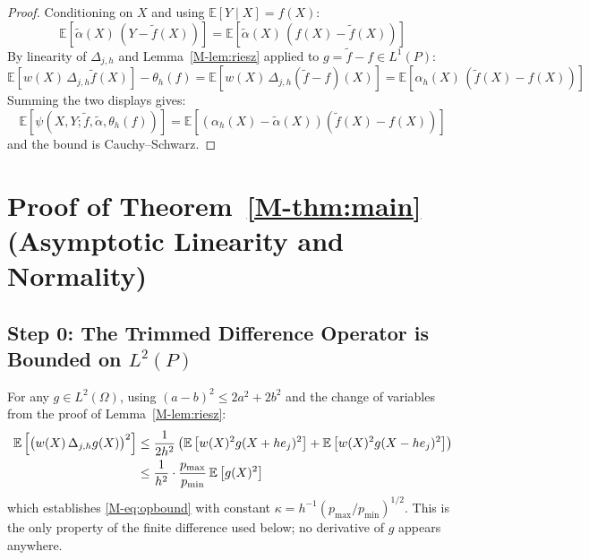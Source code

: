 \documentclass[12pt,a4paper]{article}
\numberwithin{equation}{section}
\theoremstyle{plain}
\theoremstyle{definition}
\newcommand{\E}{\mathbb{E}}
\newcommand{\Dh}{\Delta_{j,h}}
\begin{document}
	\begin{proof}
		Conditioning on $X$ and using $\E[Y \mid X] = f(X)$:
		\begin{equation}
			\E\left[\tilde{\alpha}(X)\,(Y - \tilde{f}(X))\right]
			= \E\left[\tilde{\alpha}(X)\,(f(X) - \tilde{f}(X))\right]
		\end{equation}
		By linearity of $\Dh$ and Lemma~\ref{M-lem:riesz} applied to
		$g = \tilde{f} - f \in L^1(P)$:
		\begin{equation}
			\E\left[w(X)\, \Dh \tilde{f}(X)\right] - \theta_h(f)
			= \E\left[w(X)\, \Dh (\tilde{f} - f)(X)\right]
			= \E\left[\alpha_h(X)\,(\tilde{f}(X) - f(X))\right]
		\end{equation}
		Summing the two displays gives:
		\begin{equation}
			\E\left[\psi(X, Y; \tilde{f}, \tilde{\alpha}, \theta_h(f))\right]
			= \E\left[(\alpha_h(X) - \tilde{\alpha}(X))(\tilde{f}(X) - f(X))\right]
		\end{equation}
		and the bound is Cauchy--Schwarz.
	\end{proof}
	
	\section{Proof of Theorem~\ref{M-thm:main} (Asymptotic Linearity and Normality)}
	\label{app:thm_main}
	
	\subsection{Step 0: The Trimmed Difference Operator is Bounded on $L^2(P)$}
	
	For any $g \in L^2(\Omega)$, using $(a - b)^2 \leq 2a^2 + 2b^2$ and the
	change of variables from the proof of Lemma~\ref{M-lem:riesz}:
	\begin{align}
		\E\left[\bigl(w(X)\, \Dh g(X)\bigr)^2\right]
		&\leq \frac{1}{2h^2}\left(
		\E\left[w(X)^2 g(X + h e_j)^2\right]
		+ \E\left[w(X)^2 g(X - h e_j)^2\right]\right) \notag \\
		&\leq \frac{1}{h^2} \cdot \frac{p_{\max}}{p_{\min}}\, \E\left[g(X)^2\right]
		\label{eq:opbound_proof}
	\end{align}
	which establishes \eqref{M-eq:opbound} with constant
	$\kappa = h^{-1}(p_{\max}/p_{\min})^{1/2}$. This is the only property of the
	finite difference used below; no derivative of $g$ appears anywhere.
	
\end{document}
